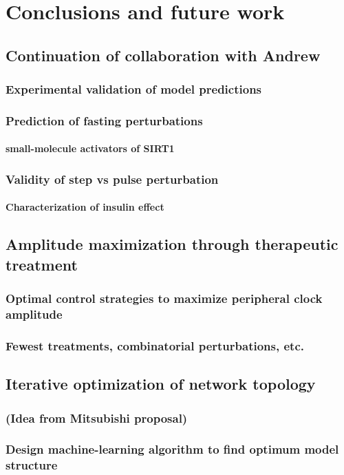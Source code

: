 \chapter{Conclusions and future work}
\section{Continuation of collaboration with Andrew}\blindtext
\subsection{Experimental validation of model predictions}\blindtext
\subsection{Prediction of fasting perturbations}\blindtext
\subsubsection{small-molecule activators of SIRT1}\blindtext
\subsection{Validity of step vs pulse perturbation}\blindtext
\subsubsection{Characterization of insulin effect}\blindtext
\section{Amplitude maximization through therapeutic treatment}\blindtext
\subsection{Optimal control strategies to maximize peripheral clock amplitude}\blindtext
\subsection{Fewest treatments, combinatorial perturbations, etc.}\blindtext
\section{Iterative optimization of network topology}\blindtext
\subsection{(Idea from Mitsubishi proposal)}\blindtext
\subsection{Design machine-learning algorithm to find optimum model structure}\blindtext
